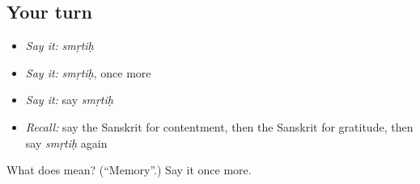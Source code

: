 \subsection*{Your turn}
\begin{itemize}
\raggedright
  \item \emph{Say it:} \emph{smṛtiḥ}
  \item \emph{Say it:} \emph{smṛtiḥ}, once more
  \item \emph{Say it:} say \emph{smṛtiḥ}
  \item \emph{Recall:} say the Sanskrit for contentment, then the Sanskrit for gratitude, then say \emph{smṛtiḥ} again
\end{itemize}

\begin{tcolorbox}[breakable,colback=teal!4,colframe=teal!35!black,title={Before you move on}]
What does  mean? (\textquotedblleft{}Memory\textquotedblright{}.) Say it once more.
\end{tcolorbox}
